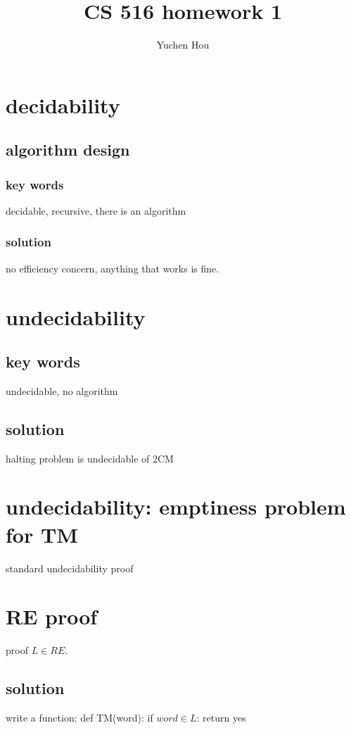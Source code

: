 \documentclass{article}
\begin{document}
\lstset{language=python}
\title{CS 516 homework 1}
\author{Yuchen Hou}
\maketitle

\section{decidability}

\subsection{algorithm design}

\subsubsection{key words}
decidable, recursive, there is an algorithm

\subsubsection{solution}
no efficiency concern, anything that works is fine.

\section{undecidability}

\subsection{key words}
undecidable, no algorithm

\subsection{solution}
halting problem is undecidable of 2CM

\section{undecidability: emptiness problem for TM}
standard undecidability proof

\section{RE proof}
proof $ L \in RE $.

\subsection{solution}
write a function:
def TM(word):
	if $ word \in L $:
		return yes
\end{document}
